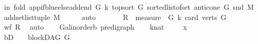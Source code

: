 \begin{isabellebody}
\ in\ fold\ {\isacharparenleft}{\kern0pt}app{\isacharunderscore}{\kern0pt}if{\isacharunderscore}{\kern0pt}blue{\isacharunderscore}{\kern0pt}else{\isacharunderscore}{\kern0pt}add{\isacharunderscore}{\kern0pt}end\ G\ k{\isacharparenright}{\kern0pt}\ {\isacharparenleft}{\kern0pt}top{\isacharunderscore}{\kern0pt}sort\ G\ {\isacharparenleft}{\kern0pt}sorted{\isacharunderscore}{\kern0pt}list{\isacharunderscore}{\kern0pt}of{\isacharunderscore}{\kern0pt}set\ {\isacharparenleft}{\kern0pt}anticone\ G\ {\isacharparenleft}{\kern0pt}snd\ M{\isacharparenright}{\kern0pt}{\isacharparenright}{\kern0pt}{\isacharparenright}{\kern0pt}{\isacharparenright}{\kern0pt}\isanewline
\ {\isacharparenleft}{\kern0pt}add{\isacharunderscore}{\kern0pt}set{\isacharunderscore}{\kern0pt}list{\isacharunderscore}{\kern0pt}tuple\ M{\isacharparenright}{\kern0pt}{\isacharparenright}{\kern0pt}\isanewline
\ {\isachardoublequoteclose}\isanewline
%
\isadelimproof
\ \ %
\endisadelimproof
%
\isatagproof
{}\isamarkupfalse%
\ auto%
\endisatagproof
{\isafoldproof}%
%
\isadelimproof
\isanewline
%
\endisadelimproof
{}\isamarkupfalse%
%
\isadelimproof
\ %
\endisadelimproof
%
\isatagproof
{}\isamarkupfalse%
\ \isanewline
\ \ \isamarkupfalse%
\ {\isacharquery}{\kern0pt}R\ {\isacharequal}{\kern0pt}\ {\isachardoublequoteopen}measure\ {\isacharparenleft}{\kern0pt}\ {\isasymlambda}{\isacharparenleft}{\kern0pt}G{\isacharcomma}{\kern0pt}\ k{\isacharparenright}{\kern0pt}{\isachardot}{\kern0pt}\ {\isacharparenleft}{\kern0pt}card\ {\isacharparenleft}{\kern0pt}verts\ G{\isacharparenright}{\kern0pt}{\isacharparenright}{\kern0pt}{\isacharparenright}{\kern0pt}{\isachardoublequoteclose}\isanewline
\ \ \isamarkupfalse%
\ {\isachardoublequoteopen}wf\ {\isacharquery}{\kern0pt}R{\isachardoublequoteclose}\ \isamarkupfalse%
\ auto\isanewline
{}\isamarkupfalse%
\isanewline
\ \ \isamarkupfalse%
\ G{\isacharcolon}{\kern0pt}{\isacharcolon}{\kern0pt}{\isachardoublequoteopen}{\isacharparenleft}{\kern0pt}{\isacharprime}{\kern0pt}a{\isacharcolon}{\kern0pt}{\isacharcolon}{\kern0pt}linorder{\isacharcomma}{\kern0pt}{\isacharprime}{\kern0pt}b{\isacharparenright}{\kern0pt}\ pre{\isacharunderscore}{\kern0pt}digraph{\isachardoublequoteclose}\isanewline
\ \ \isamarkupfalse%
\ k{\isacharcolon}{\kern0pt}{\isacharcolon}{\kern0pt}nat\ \isanewline
\ \ \isamarkupfalse%
\ x\isanewline
\ \ \isamarkupfalse%
\ bD{\isacharcolon}{\kern0pt}\ \ {\isachardoublequoteopen}{\isasymnot}\ {\isasymnot}\ blockDAG\ G{\isachardoublequoteclose}\isanewline

\end{isabellebody}
